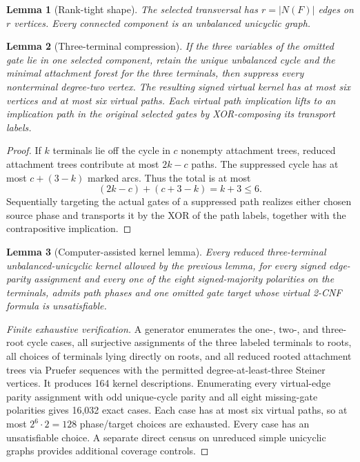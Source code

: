 \documentclass[11pt]{article}
\newtheorem{lemma}{Lemma}
\begin{document}
\begin{lemma}[Rank-tight shape]
The selected transversal has $r=|N(F)|$ edges on $r$ vertices. Every connected
component is an unbalanced unicyclic graph.
\end{lemma}

\begin{lemma}[Three-terminal compression]
If the three variables of the omitted gate lie in one selected component, retain
the unique unbalanced cycle and the minimal attachment forest for the three
terminals, then suppress every nonterminal degree-two vertex. The resulting
signed virtual kernel has at most six vertices and at most six virtual paths.
Each virtual path implication lifts to an implication path in the original
selected gates by XOR-composing its transport labels.
\end{lemma}

\begin{proof}
If $k$ terminals lie off the cycle in $c$ nonempty attachment trees, reduced
attachment trees contribute at most $2k-c$ paths. The suppressed cycle has at
most $c+(3-k)$ marked arcs. Thus the total is at most
\[
 (2k-c)+(c+3-k)=k+3\le6.
\]
Sequentially targeting the actual gates of a suppressed path realizes either
chosen source phase and transports it by the XOR of the path labels, together
with the contrapositive implication.
\end{proof}

\begin{lemma}[Computer-assisted kernel lemma]
Every reduced three-terminal unbalanced-unicyclic kernel allowed by the previous
lemma, for every signed edge-parity assignment and every one of the eight
signed-majority polarities on the terminals, admits path phases and one omitted
gate target whose virtual 2-CNF formula is unsatisfiable.
\end{lemma}

\begin{proof}[Finite exhaustive verification]
A generator enumerates the one-, two-, and three-root cycle cases, all
surjective assignments of the three labeled terminals to roots, all choices of
terminals lying directly on roots, and all reduced rooted attachment trees via
Pruefer sequences with the permitted degree-at-least-three Steiner vertices.
It produces 164 kernel descriptions. Enumerating every virtual-edge parity
assignment with odd unique-cycle parity and all eight missing-gate polarities
gives 16,032 exact cases. Each case has at most six virtual paths, so at most
$2^6\cdot2=128$ phase/target choices are exhausted. Every case has an
unsatisfiable choice. A separate direct census on unreduced simple unicyclic
graphs provides additional coverage controls.
\end{proof}
\end{document}

